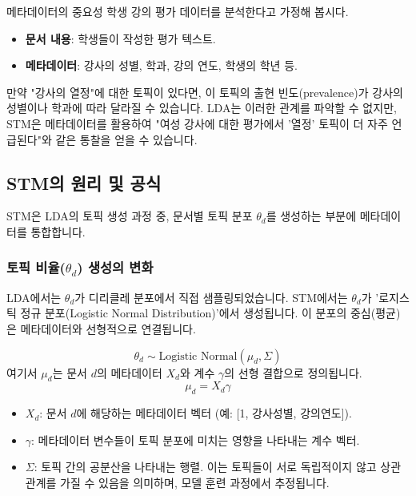 \documentclass[11pt,a4paper]{article}
\begin{document}
\begin{examplebox}{메타데이터의 중요성}
학생 강의 평가 데이터를 분석한다고 가정해 봅시다.
\begin{itemize}
    \item \textbf{문서 내용}: 학생들이 작성한 평가 텍스트.
    \item \textbf{메타데이터}: 강사의 성별, 학과, 강의 연도, 학생의 학년 등.
\end{itemize}
만약 "강사의 열정"에 대한 토픽이 있다면, 이 토픽의 출현 빈도(prevalence)가 강사의 성별이나 학과에 따라 달라질 수 있습니다. LDA는 이러한 관계를 파악할 수 없지만, STM은 메타데이터를 활용하여 "여성 강사에 대한 평가에서 '열정' 토픽이 더 자주 언급된다"와 같은 통찰을 얻을 수 있습니다.
\end{examplebox}

\subsection{STM의 원리 및 공식}
STM은 LDA의 토픽 생성 과정 중, 문서별 토픽 분포 $\theta_d$를 생성하는 부분에 메타데이터를 통합합니다.

\subsubsection{토픽 비율($\theta_d$) 생성의 변화}
LDA에서는 $\theta_d$가 디리클레 분포에서 직접 샘플링되었습니다. STM에서는 $\theta_d$가 '로지스틱 정규 분포(Logistic Normal Distribution)'에서 생성됩니다. 이 분포의 중심(평균)은 메타데이터와 선형적으로 연결됩니다.

\begin{equation*}
\theta_d \sim \text{Logistic Normal}(\mu_d, \Sigma)
\end{equation*}
여기서 $\mu_d$는 문서 $d$의 메타데이터 $X_d$와 계수 $\gamma$의 선형 결합으로 정의됩니다.
\begin{equation*}
\mu_d = X_d \gamma
\end{equation*}

\begin{itemize}
    \item \textbf{$X_d$}: 문서 $d$에 해당하는 메타데이터 벡터 (예: [1, 강사성별, 강의연도]).
    \item \textbf{$\gamma$}: 메타데이터 변수들이 토픽 분포에 미치는 영향을 나타내는 계수 벡터.
    \item \textbf{$\Sigma$}: 토픽 간의 공분산을 나타내는 행렬. 이는 토픽들이 서로 독립적이지 않고 상관관계를 가질 수 있음을 의미하며, 모델 훈련 과정에서 추정됩니다.
\end{itemize}
\end{document}

